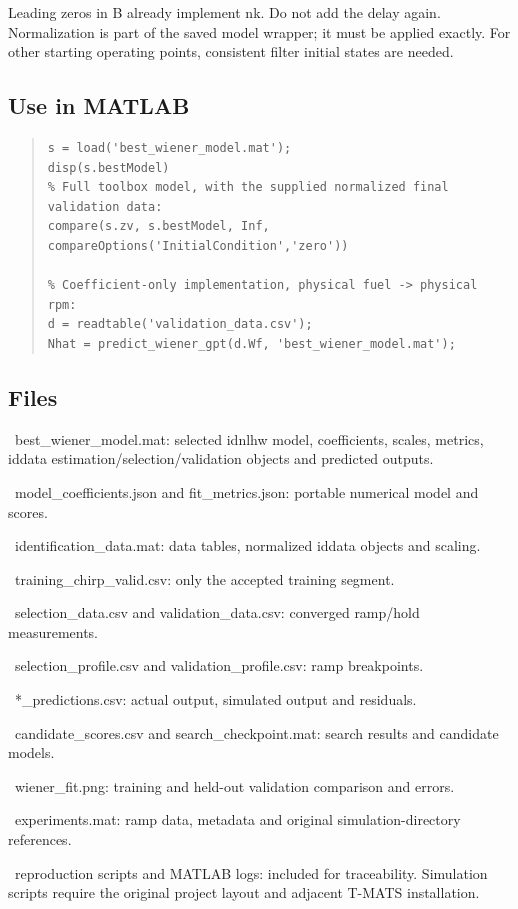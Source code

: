 Leading zeros in B already implement nk. Do not add the delay again.
Normalization is part of the saved model wrapper; it must be applied exactly.
For other starting operating points, consistent filter initial states are needed.

\subsection{Use in MATLAB}

\begin{quote}\footnotesize
\begin{verbatim}
s = load('best_wiener_model.mat');
disp(s.bestModel)
% Full toolbox model, with the supplied normalized final validation data:
compare(s.zv, s.bestModel, Inf, compareOptions('InitialCondition','zero'))

% Coefficient-only implementation, physical fuel -> physical rpm:
d = readtable('validation_data.csv');
Nhat = predict_wiener_gpt(d.Wf, 'best_wiener_model.mat');
\end{verbatim}
\end{quote}

\subsection{Files}

\par\noindent\textbullet\ best\_\allowbreak wiener\_\allowbreak model.mat: selected idnlhw model, coefficients, scales, metrics,
iddata estimation/selection/validation objects and predicted outputs.
\par\noindent\textbullet\ model\_\allowbreak coefficients.json and fit\_\allowbreak metrics.json: portable numerical model and scores.
\par\noindent\textbullet\ identification\_\allowbreak data.mat: data tables, normalized iddata objects and scaling.
\par\noindent\textbullet\ training\_\allowbreak chirp\_\allowbreak valid.csv: only the accepted training segment.
\par\noindent\textbullet\ selection\_\allowbreak data.csv and validation\_\allowbreak data.csv: converged ramp/hold measurements.
\par\noindent\textbullet\ selection\_\allowbreak profile.csv and validation\_\allowbreak profile.csv: ramp breakpoints.
\par\noindent\textbullet\ *\_\allowbreak predictions.csv: actual output, simulated output and residuals.
\par\noindent\textbullet\ candidate\_\allowbreak scores.csv and search\_\allowbreak checkpoint.mat: search results and candidate models.
\par\noindent\textbullet\ wiener\_\allowbreak fit.png: training and held-out validation comparison and errors.
\par\noindent\textbullet\ experiments.mat: ramp data, metadata and original simulation-directory references.
\par\noindent\textbullet\ reproduction scripts and MATLAB logs: included for traceability. Simulation
scripts require the original project layout and adjacent T-MATS installation.


